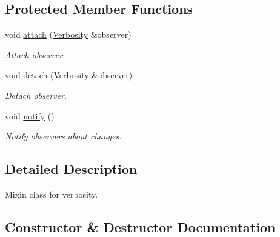 \subsection*{Protected Member Functions}
\begin{DoxyCompactItemize}
\item 
\hypertarget{classSpacy_1_1Mixin_1_1MixinConnection_abb5520ee6b22dd993d78f142939a1ed4}{}void \hyperlink{classSpacy_1_1Mixin_1_1MixinConnection_abb5520ee6b22dd993d78f142939a1ed4}{attach} (\hyperlink{classSpacy_1_1Mixin_1_1Verbosity}{Verbosity} \&observer)\label{classSpacy_1_1Mixin_1_1MixinConnection_abb5520ee6b22dd993d78f142939a1ed4}

\begin{DoxyCompactList}\small\item\em Attach observer. \end{DoxyCompactList}\item 
\hypertarget{classSpacy_1_1Mixin_1_1MixinConnection_adda739590c487679c26f60e50aedb73f}{}void \hyperlink{classSpacy_1_1Mixin_1_1MixinConnection_adda739590c487679c26f60e50aedb73f}{detach} (\hyperlink{classSpacy_1_1Mixin_1_1Verbosity}{Verbosity} \&observer)\label{classSpacy_1_1Mixin_1_1MixinConnection_adda739590c487679c26f60e50aedb73f}

\begin{DoxyCompactList}\small\item\em Detach observer. \end{DoxyCompactList}\item 
\hypertarget{classSpacy_1_1Mixin_1_1MixinConnection_a1ddeaa78a3bb4a38c2cca36d1f99fe36}{}void \hyperlink{classSpacy_1_1Mixin_1_1MixinConnection_a1ddeaa78a3bb4a38c2cca36d1f99fe36}{notify} ()\label{classSpacy_1_1Mixin_1_1MixinConnection_a1ddeaa78a3bb4a38c2cca36d1f99fe36}

\begin{DoxyCompactList}\small\item\em Notify observers about changes. \end{DoxyCompactList}\end{DoxyCompactItemize}


\subsection{Detailed Description}
Mixin class for verbosity. 

\subsection{Constructor \& Destructor Documentation}
\hypertarget{classSpacy_1_1Mixin_1_1Verbosity_aefe2f237b0456c4bced001fbfa75f92e_aefe2f237b0456c4bced001fbfa75f92e}{}
